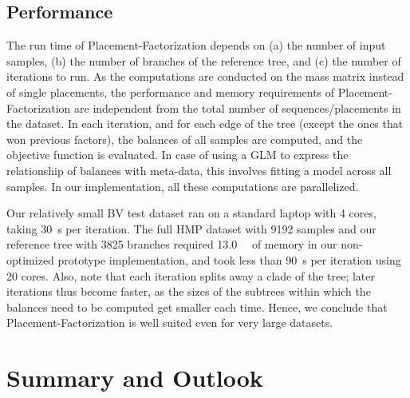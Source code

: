 \subsection{Performance}
\label{ch:Factorization:sec:Evaluation:sub:Performance}

The run time of Placement-Factorization depends on
(a) the number of input samples, (b) the number of branches of the reference tree, and (c) the number of iterations to run.
As the computations are conducted on the mass matrix instead of single placements,
the performance and memory requirements of Placement-Factorization are independent
from the total number of sequences/placements in the dataset.
In each iteration, and for each edge of the tree (except the ones that won previous factors),
the balances of all samples are computed, and the objective function is evaluated.
In case of using a \ac{GLM} to express the relationship of balances with meta-data,
this involves fitting a model across all samples.
In our implementation, all these computations are parallelized.

Our relatively small \ac{BV} test dataset ran on a standard laptop with \num{4} cores,
taking \SI{30}{\second} per iteration.
The full \ac{HMP} dataset with \num{9 192} samples and our reference tree with \num{3 825} branches
required \SI{13.0}{\giga\byte} of memory in our non-optimized prototype implementation,
and took less than \SI{90}{\second} per iteration using \num{20} cores.
Also, note that each iteration splits away a clade of the tree;
later iterations thus become faster,
as the sizes of the subtrees within which the balances need to be computed get smaller each time.
Hence, we conclude that Placement-Factorization is well suited even for very large datasets.


\section{Summary and Outlook}
\label{ch:Factorization:sec:SummaryOutlook}

